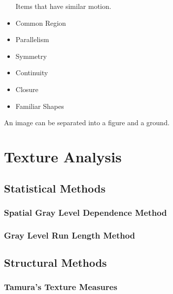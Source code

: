 \documentclass{article}
\begin{document}
\begin{multicols}{2}
\begin{itemize}
  Items that have similar motion.
  \item {Common Region}
  \item {Parallelism}
  \item {Symmetry}
  \item {Continuity}
  \item {Closure}
  \item {Familiar Shapes}
\end{itemize}

An image can be separated into a figure and a ground.

\section{Texture Analysis}
\subsection{Statistical Methods}
\subsubsection{Spatial Gray Level Dependence Method}
\subsubsection{Gray Level Run Length Method}
\subsection{Structural Methods}
\subsubsection{Tamura's Texture Measures}




\end{multicols}
\end{document}
